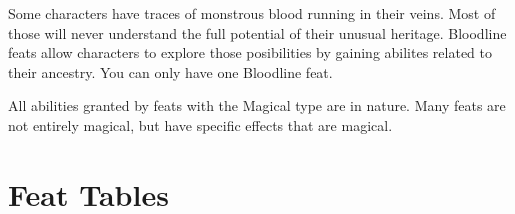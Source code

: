      Some characters have traces of monstrous blood running in their veins.
    Most of those will never understand the full potential of their unusual heritage.
    Bloodline feats allow characters to explore those posibilities by gaining abilites related to their ancestry.
    You can only have one Bloodline feat.

    All abilities granted by feats with the Magical type are  in nature.
    Many feats are not entirely magical, but have specific effects that are magical.

\section{Feat Tables}


